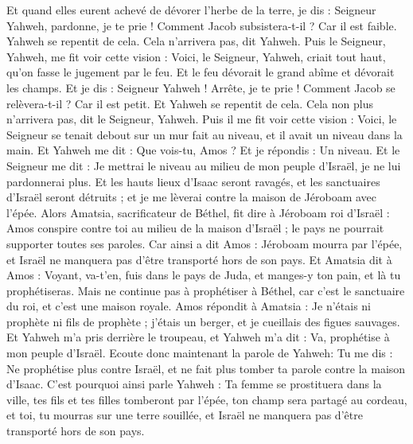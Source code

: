 \begin{multicols}{2}
Et quand elles eurent achevé de dévorer l'herbe de la terre, je dis : Seigneur Yahweh, pardonne, je te prie ! Comment Jacob subsistera-t-il ? Car il est faible.
Yahweh se repentit de cela. Cela n'arrivera pas, dit Yahweh.
Puis le Seigneur, Yahweh, me fit voir cette vision : Voici, le Seigneur, Yahweh, criait tout haut, qu'on fasse le jugement par le feu. Et le feu dévorait le grand abîme et dévorait les champs.
Et je dis : Seigneur Yahweh ! Arrête, je te prie ! Comment Jacob se relèvera-t-il ? Car il est petit.
Et Yahweh se repentit de cela. Cela non plus n'arrivera pas, dit le Seigneur, Yahweh.
Puis il me fit voir cette vision : Voici, le Seigneur se tenait debout sur un mur fait au niveau, et il avait un niveau dans la main.
Et Yahweh me dit : Que vois-tu, Amos ? Et je répondis : Un niveau. Et le Seigneur me dit : Je mettrai le niveau au milieu de mon peuple d'Israël, je ne lui pardonnerai plus.
Et les hauts lieux d'Isaac seront ravagés, et les sanctuaires d'Israël seront détruits ; et je me lèverai contre la maison de Jéroboam avec l'épée.
Alors Amatsia, sacrificateur de Béthel, fit dire à Jéroboam roi d'Israël : Amos conspire contre toi au milieu de la maison d'Israël ; le pays ne pourrait supporter toutes ses paroles.
Car ainsi a dit Amos : Jéroboam mourra par l'épée, et Israël ne manquera pas d'être transporté hors de son pays.
Et Amatsia dit à Amos : Voyant, va-t'en, fuis dans le pays de Juda, et manges-y ton pain, et là tu prophétiseras.
Mais ne continue pas à prophétiser à Béthel, car c'est le sanctuaire du roi, et c'est une maison royale.
Amos répondit à Amatsia : Je n'étais ni prophète ni fils de prophète ; j'étais un berger, et je cueillais des figues sauvages.
Et Yahweh m'a pris derrière le troupeau, et Yahweh m'a dit : Va, prophétise à mon peuple d'Israël.
Ecoute donc maintenant la parole de Yahweh: Tu me dis : Ne prophétise plus contre Israël, et ne fait plus tomber ta parole contre la maison d'Isaac.
C'est pourquoi ainsi parle Yahweh : Ta femme se prostituera dans la ville, tes fils et tes filles tomberont par l'épée, ton champ sera partagé au cordeau, et toi, tu mourras sur une terre souillée, et Israël ne manquera pas d'être transporté hors de son pays.

\end{multicols}
